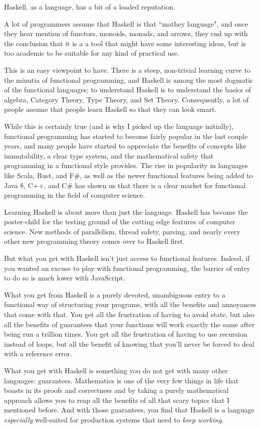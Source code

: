 \begin{foreword}

Haskell, as a language, has a bit of a loaded reputation.  

A lot of programmers assume that Haskell is that ``mathey language", and once they hear mention of functors, monoids, monads, and arrows, they end up with the conclusion that it is a a tool that might have some interesting ideas, but is too academic to be suitable for any kind of practical use. 

This is an easy viewpoint to have.  There is a steep, non-trivial learning curve to the minutia of functional programming, and Haskell is among the most dogmatic of the functional languages; to understand Haskell is to understand the basics of algebra, Category Theory, Type Theory, and Set Theory.  Consequently, a lot of people assume that people learn Haskell so that they can look smart. 

While this is certainly true (and is why I picked up the language initially), functional programming has started to become fairly popular in the last couple years, and many people have started to appreciate the benefits of concepts like immutability, a clear type system, and the mathematical safety that programming in a functional style provides. The rise in popularity in languages like Scala, Rust, and F\#, as well as the newer functional features being added to Java 8, C++, and C\# has shown us that there is a clear market for functional programming in the field of computer science. 

Learning Haskell is about more than just the language. Haskell has become the poster-child for the testing ground of the cutting edge features of computer science. New methods of parallelism, thread safety, parsing, and nearly every other new programming theory comes over to Haskell first. 

But what you get with Haskell isn't just access to functional features.  Indeed, if you wanted an excuse to play with functional programming, the barrier of entry to do so is much lower with JavaScript.  

What you get from Haskell is a purely devoted, unambiguous entry to a functional way of structuring your programs, with all the benefits and annoyances that come with that. You get all the frustration of having to avoid state, but also all the benefits of guarantees that your functions will work exactly the same after being run a trillion times. You get all the frustration of having to use recursion instead of loops, but all the benefit of knowing that you'll never be forced to deal with a  reference error. 

What you get with Haskell is something you do not get with many other languages: guarantees. Mathematics is one of the very few things in life that boasts in its proofs and correctness and by taking a purely mathematical approach allows you to reap all the benefits of all that scary topics that I mentioned before. 
And with those guarantees, you find that Haskell is a language \textit{especially} well-suited for production systems that need to \textit{keep working}. 


\end{foreword}

